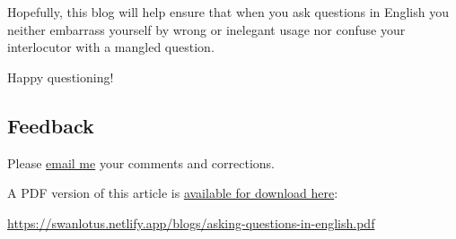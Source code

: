 \documentclass[
  a4paper,
]{article}
\begin{document}
Hopefully, this blog will help ensure that when you ask questions in
English you neither embarrass yourself by wrong or inelegant usage nor
confuse your interlocutor with a mangled question.

Happy questioning!  \normalfont

\hypertarget{feedback}{%
\subsection{Feedback}\label{feedback}}

Please \href{mailto:feedback.swanlotus@gmail.com}{email me} your
comments and corrections.

\noindent A PDF version of this article is
\href{./asking-questions-in-english.pdf}{available for download here}:

\begin{normalsize}

\begin{ttfamily}

\url{https://swanlotus.netlify.app/blogs/asking-questions-in-english.pdf}

\end{ttfamily}

\end{normalsize}
\end{document}
